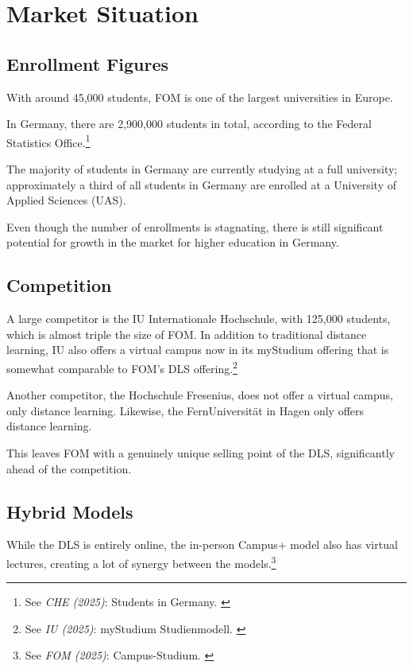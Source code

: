 %
%

\pagebreak
\section{Market Situation}

\onehalfspacing

\subsection{Enrollment Figures}

With around 45,000 students, FOM is one of the largest universities in Europe.

In Germany, there are 2,900,000 students in total, according to the Federal Statistics Office.\footnote{See \textit{CHE (2025)}: Students in Germany. \cite{cheDaten}}

The majority of students in Germany are currently studying at a full university; approximately a third of all students in Germany are enrolled at a University of Applied Sciences (UAS).

Even though the number of enrollments is stagnating, there is still significant potential for growth in the market for higher education in Germany.

\subsection{Competition}

A large competitor is the IU Internationale Hochschule, with 125,000 students, which is almost triple the size of FOM. In addition to traditional distance learning, IU also offers a virtual campus now in its myStudium offering that is somewhat comparable to FOM's DLS offering.\footnote{See \textit{IU (2025)}: myStudium Studienmodell. \cite{myStudium}}

Another competitor, the Hochschule Fresenius, does not offer a virtual campus, only distance learning. Likewise, the FernUniversität in Hagen only offers distance learning.

This leaves FOM with a genuinely unique selling point of the DLS, significantly ahead of the competition.

\subsection{Hybrid Models}

While the DLS is entirely online, the in-person Campus+ model also has virtual lectures, creating a lot of synergy between the models.\footnote{See \textit{FOM (2025)}: Campus-Studium. \cite{fomCampus}}

